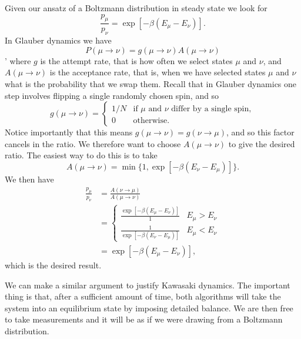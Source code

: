 \documentclass[fleqn]{NotesClass}
\begin{document}
    Given our ansatz of a Boltzmann distribution in steady state we look for
    \begin{equation}
        \frac{p_\mu}{p_\nu} = \exp[-\beta(E_\mu - E_\nu)].
    \end{equation}
    In Glauber dynamics we have
    \begin{equation}
        P(\mu \to \nu) = g(\mu \to \nu)A(\mu \to \nu)
    \end{equation}'	where \(g\) is the attempt rate, that is how often we select states \(\mu\) and \(\nu\), and \(A(\mu \to \nu)\) is the acceptance rate, that is, when we have selected states \(\mu\) and \(\nu\) what is the probability that we swap them.
    Recall that in Glauber dynamics one step involves flipping a single randomly chosen spin, and so
    \begin{equation}
        g(\mu \to \nu) = 
        \begin{cases}
            1/N & \text{if }\mu \text{ and } \nu \text{ differ by a single spin},\\
            0 & \text{otherwise}.
        \end{cases}
    \end{equation}
    Notice importantly that this means \(g(\mu \to \nu) = g(\nu \to \mu)\), and so this factor cancels in the ratio.
    We therefore want to choose \(A(\mu \to \nu)\) to give the desired ratio.
    The easiest way to do this is to take
    \begin{equation}
        A(\mu \to \nu) = \min\{1, \exp[-\beta(E_\nu - E_\mu)]\}.
    \end{equation}
    We then have
    \begin{align}
        \frac{p_\mu}{p_\nu} &= \frac{A(\nu \to \mu)}{A(\mu \to \nu)}\\
        &= 
        \begin{cases}
            \frac{\exp[-\beta(E_\mu - E_\nu)]}{1} & E_\mu > E_\nu\\
            \frac{1}{\exp[-\beta(E_\nu - E_\mu)]} & E_\mu < E_\nu
        \end{cases}
        \\
        &= \exp[-\beta(E_\mu - E_\nu)],
    \end{align}
    which is the desired result.
    
    We can make a similar argument to justify Kawasaki dynamics.
    The important thing is that, after a sufficient amount of time, both algorithms will take the system into an equilibrium state by imposing detailed balance.
    We are then free to take measurements and it will be as if we were drawing from a Boltzmann distribution.
    
\end{document}
